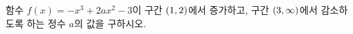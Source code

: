 함수 $f(x)=-x^3+2ax^2-3$이 구간 $(1{,}\mkern3mu\mathopen{}2)$에서 증가하고, 구간 $(3{,}\mkern3mu\mathopen{}\infty)$에서 감소하도록 하는 정수 $a$의 값을 구하시오.
